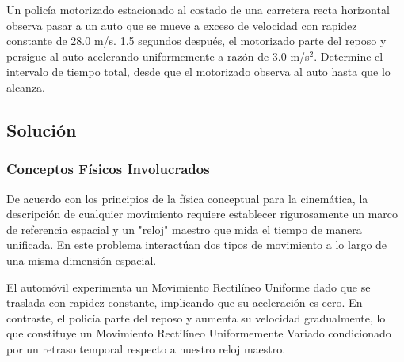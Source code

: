 \documentclass[12pt, a4paper]{article}
\begin{document}
Un policía motorizado estacionado al costado de una carretera recta horizontal observa pasar a un auto que se mueve a exceso de velocidad con rapidez constante de 28.0 m/s. 1.5 segundos después, el motorizado parte del reposo y persigue al auto acelerando uniformemente a razón de 3.0 m/s$^2$. Determine el intervalo de tiempo total, desde que el motorizado observa al auto hasta que lo alcanza.

\vspace{0.5cm}

\begin{center}
\end{center}

\subsection*{Solución}

\subsubsection*{Conceptos Físicos Involucrados}

De acuerdo con los principios de la física conceptual para la cinemática, la descripción de cualquier movimiento requiere establecer rigurosamente un marco de referencia espacial y un "reloj" maestro que mida el tiempo de manera unificada. En este problema interactúan dos tipos de movimiento a lo largo de una misma dimensión espacial. 

El automóvil experimenta un Movimiento Rectilíneo Uniforme dado que se traslada con rapidez constante, implicando que su aceleración es cero. En contraste, el policía parte del reposo y aumenta su velocidad gradualmente, lo que constituye un Movimiento Rectilíneo Uniformemente Variado condicionado por un retraso temporal respecto a nuestro reloj maestro.
\end{document}
